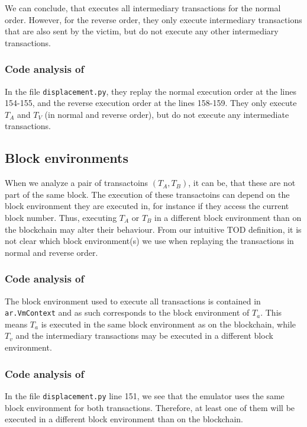 \documentclass[draft,final]{vutinfth} %
\begin{document}
We can conclude, that \cite{zhang_combatting_2023} executes all intermediary transactions for the normal order. However, for the reverse order, they only execute intermediary transactions that are also sent by the victim, but do not execute any other intermediary transactions.

\subsubsection{Code analysis of \cite{torres_frontrunner_2021}}

In the file \verb|displacement.py|, they replay the normal execution order at the lines 154-155, and the reverse execution order at the lines 158-159. They only execute $T_A$ and $T_V$ (in normal and reverse order), but do not execute any intermediate transactions.

\subsection{Block environments}

When we analyze a pair of transactoins $(T_A, T_B)$, it can be, that these are not part of the same block. The execution of these transactoins can depend on the block environment they are executed in, for instance if they access the current block number. Thus, executing $T_A$ or $T_B$ in a different block environment than on the blockchain may alter their behaviour. From our intuitive TOD definition, it is not clear which block environment(s) we use when replaying the transactions in normal and reverse order.

\subsubsection{Code analysis of \cite{zhang_combatting_2023}}

The block environment used to execute all transactions is contained in \verb|ar.VmContext| and as such corresponds to the block environment of $T_a$. This means $T_a$ is executed in the same block environment as on the blockchain, while $T_v$ and the intermediary transactions may be executed in a different block environment.

\subsubsection{Code analysis of \cite{torres_frontrunner_2021}}

In the file \verb|displacement.py| line 151, we see that the emulator uses the same block environment for both transactions. Therefore, at least one of them will be executed in a different block environment than on the blockchain.
\end{document}
